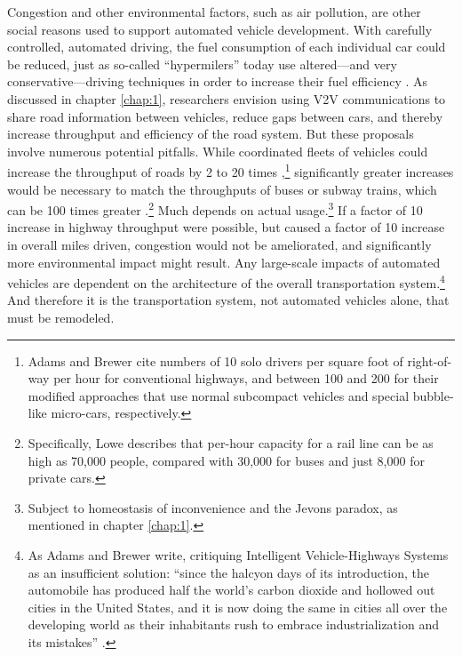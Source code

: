 Congestion and other environmental factors, such as air pollution, are
other social reasons used to support automated vehicle development.
With carefully controlled, automated driving, the fuel consumption of each
individual car could be reduced, just as so-called ``hypermilers''
today use altered---and very conservative---driving techniques in
order to increase their fuel efficiency \cite{orourkeHypermile}. As discussed in
chapter \ref{chap:1}, researchers envision using V2V communications to
share road information between vehicles, reduce gaps between cars, and
thereby increase throughput and efficiency of the road system. But
these proposals involve numerous potential pitfalls. While coordinated
fleets of vehicles could increase the throughput of roads by 2 to 20
times \cite[p. 229]{adamsBrewerRoadways},\footnote{Adams and Brewer
  cite numbers of 10 solo drivers per square foot of right-of-way per
  hour for conventional highways, and between 100 and 200 for their
  modified approaches that use normal subcompact vehicles and special
  bubble-like micro-cars, respectively.} significantly greater increases would be necessary to match the
throughputs of buses or subway trains, which can be 100 times
greater \cite[p. 222]{loweCars}.\footnote{Specifically, Lowe describes that
  per-hour capacity for 
  a rail line can be as high as 70,000 people, compared with 30,000 for buses
and just 8,000 for private cars.} Much depends on actual usage.\footnote{Subject to
homeostasis of inconvenience and the Jevons paradox, as mentioned in
chapter \ref{chap:1}.} If a factor of 10
increase in highway throughput were possible, but caused a factor of
10 increase in overall miles driven, congestion would not be
ameliorated, and significantly more environmental impact might result. Any
large-scale impacts of automated vehicles are dependent on the
architecture of the overall transportation system.\footnote{As Adams
  and Brewer write, critiquing Intelligent Vehicle-Highways Systems as
  an insufficient solution: ``since the halcyon days of its introduction, the
  automobile has produced half the world's carbon dioxide and hollowed
out cities in the United States, and it is now doing the same in
cities all over the developing world as their inhabitants rush to
embrace industrialization and its mistakes'' \cite[p.
  227]{adamsBrewerRoadways}.} And therefore it is
the transportation system, not automated vehicles alone, that must be remodeled.

